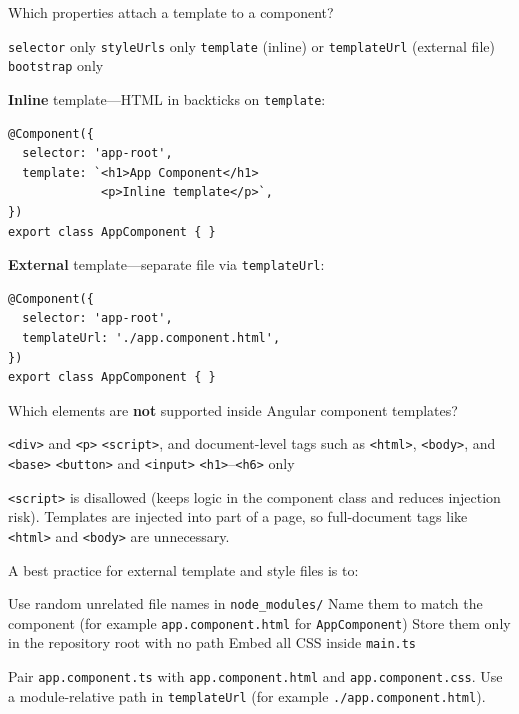 \question[4]
Which properties attach a template to a component?
\begin{choices}
  \choice \texttt{selector} only
  \choice \texttt{styleUrls} only
  \CorrectChoice \texttt{template} (inline) or \texttt{templateUrl} (external file)
  \choice \texttt{bootstrap} only
\end{choices}
\begin{solution}
  \textbf{Inline} template---HTML in backticks on \texttt{template}:
\begin{lstlisting}[style=ts]
@Component({
  selector: 'app-root',
  template: `<h1>App Component</h1>
             <p>Inline template</p>`,
})
export class AppComponent { }
\end{lstlisting}
  \textbf{External} template---separate file via \texttt{templateUrl}:
\begin{lstlisting}[style=ts]
@Component({
  selector: 'app-root',
  templateUrl: './app.component.html',
})
export class AppComponent { }
\end{lstlisting}
\end{solution}

\question[4]
Which elements are \textbf{not} supported inside Angular component templates?
\begin{choices}
  \choice \texttt{<div>} and \texttt{<p>}
  \CorrectChoice \texttt{<script>}, and document-level tags such as \texttt{<html>}, \texttt{<body>}, and \texttt{<base>}
  \choice \texttt{<button>} and \texttt{<input>}
  \choice \texttt{<h1>}--\texttt{<h6>} only
\end{choices}
\begin{solution}
  \texttt{<script>} is disallowed (keeps logic in the component class and reduces injection risk). Templates are injected into part of a page, so full-document tags like \lstinline[style=htmlinline]{<html>} and \lstinline[style=htmlinline]{<body>} are unnecessary.
\end{solution}

\question[4]
A best practice for external template and style files is to:
\begin{choices}
  \choice Use random unrelated file names in \texttt{node\_modules/}
  \CorrectChoice Name them to match the component (for example \texttt{app.component.html} for \texttt{AppComponent})
  \choice Store them only in the repository root with no path
  \choice Embed all CSS inside \texttt{main.ts}
\end{choices}
\begin{solution}
  Pair \texttt{app.component.ts} with \texttt{app.component.html} and \texttt{app.component.css}. Use a module-relative path in \texttt{templateUrl} (for example \lstinline[style=tsinline]{./app.component.html}).
\end{solution}

